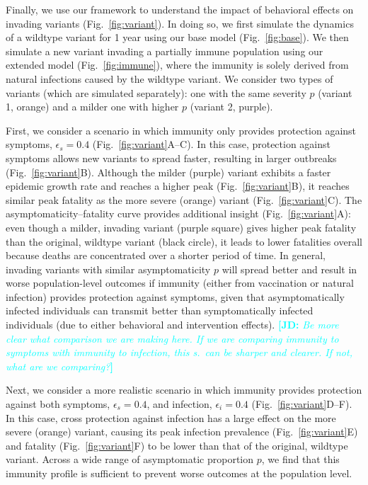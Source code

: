 \documentclass[12pt]{article}
\newcommand{\comment}{\showcomment}
\newcommand{\showcomment}[3]{\textcolor{#1}{\textbf{[#2: }\textsl{#3}\textbf{]}}}
\newcommand{\jd}[1]{\comment{cyan}{JD}{#1}}
\newcommand{\fref}[1]{Fig.~\ref{fig:#1}}
\begin{document}
Finally, we use our framework to understand the impact of behavioral effects on invading variants (\fref{variant}).
In doing so, we first simulate the dynamics of a wildtype variant for 1 year using our base model (\fref{base}).
We then simulate a new variant invading a partially immune population using our extended model (\fref{immune}), where the immunity is solely derived from natural infections caused by the wildtype variant.
We consider two types of variants (which are simulated separately): one with the same severity $p$ (variant 1, orange) and a milder one with higher $p$ (variant 2, purple).

First, we consider a scenario in which immunity only provides protection against symptoms, $\epsilon_s = 0.4$ (\fref{variant}A--C).
In this case, protection against symptoms allows new variants to spread faster, resulting in larger outbreaks (\fref{variant}B).
Although the milder (purple) variant exhibits a faster epidemic growth rate and reaches a higher peak (\fref{variant}B), it reaches similar peak fatality as the more severe (orange) variant (\fref{variant}C).
The asymptomaticity--fatality curve provides additional insight (\fref{variant}A): even though a milder, invading variant (purple square) gives higher peak fatality than the original, wildtype variant (black circle), it leads to lower fatalities overall because deaths are concentrated over a shorter period of time.
In general, invading variants with similar asymptomaticity $p$ will spread better and result in worse population-level outcomes if immunity (either from vaccination or natural infection) provides protection against symptoms, given that asymptomatically infected individuals can transmit better than symptomatically infected individuals (due to either behavioral and intervention effects).
\jd{Be more clear what comparison we are making here. If we are comparing immunity to symptoms with immunity to infection, this s.~can be sharper and clearer. If not, what are we comparing?}

Next, we consider a more realistic scenario in which immunity provides protection against both symptoms, $\epsilon_s = 0.4$, and infection, $\epsilon_i = 0.4$ (\fref{variant}D--F).
In this case, cross protection against infection has a large effect on the more severe (orange) variant, causing its peak infection prevalence (\fref{variant}E) and fatality (\fref{variant}F) to be lower than that of the original, wildtype variant.
Across a wide range of asymptomatic proportion $p$, we find that this immunity profile is sufficient to prevent worse outcomes at the population level.
\end{document}
